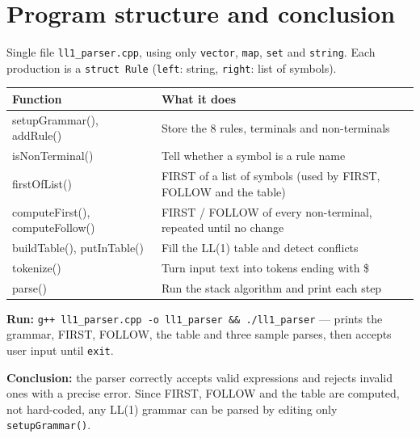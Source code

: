 \documentclass[10pt,a4paper]{article}
\newcommand{\tk}[1]{\texttt{#1}}
\begin{document}
\section{Program structure and conclusion}
Single file \tk{ll1\_parser.cpp}, using only \tk{vector}, \tk{map}, \tk{set} and \tk{string}. Each production is a
\tk{struct Rule} (\tk{left}: string, \tk{right}: list of symbols).

\begin{center}
\small
\begin{tabular}{@{}>{\ttfamily}l l@{}}
\toprule
\normalfont Function & What it does \\
\midrule
setupGrammar(), addRule() & Store the 8 rules, terminals and non-terminals \\
isNonTerminal() & Tell whether a symbol is a rule name \\
firstOfList() & FIRST of a list of symbols (used by FIRST, FOLLOW and the table) \\
computeFirst(), computeFollow() & FIRST / FOLLOW of every non-terminal, repeated until no change \\
buildTable(), putInTable() & Fill the LL(1) table and detect conflicts \\
tokenize() & Turn input text into tokens ending with \$ \\
parse() & Run the stack algorithm and print each step \\
\bottomrule
\end{tabular}
\end{center}

\textbf{Run:} \tk{g++ ll1\_parser.cpp -o ll1\_parser \&\& ./ll1\_parser} --- prints the grammar, FIRST, FOLLOW, the table
and three sample parses, then accepts user input until \tk{exit}.

\textbf{Conclusion:} the parser correctly accepts valid expressions and rejects invalid ones with a precise
error. Since FIRST, FOLLOW and the table are computed, not hard-coded, any LL(1) grammar can be parsed by
editing only \tk{setupGrammar()}.
\end{document}
